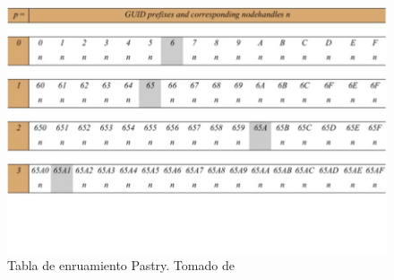 

  
  	\begin{figure}%
  				\begin{center}
  	\includegraphics[width=0.8\linewidth] {10/pastry-tab} 
  	\caption{Tabla de enruamiento Pastry. Tomado de \cite{Coulouris2011}}
  	\label{fig:pastry-te}
  			\end{center}
  \end{figure}
 
 

 